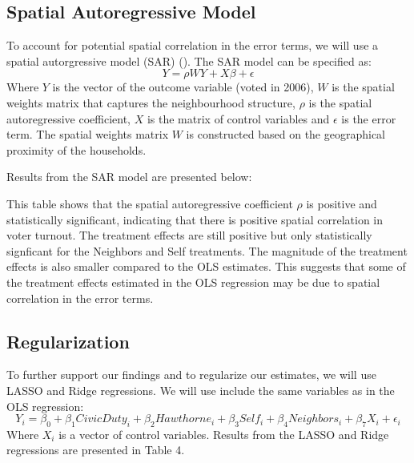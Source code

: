\documentclass[11pt]{article}
\begin{document}
\subsection{Spatial Autoregressive Model}
To account for potential spatial correlation in the error terms, we will use a spatial autorgressive model (SAR) (\cite{lord_chapter_2021}). The SAR model can be specified as:
\begin{equation}
    Y = \rho W Y + X\beta + \epsilon
\end{equation}
Where $Y$ is the vector of the outcome variable (voted in 2006), $W$ is the spatial weights matrix that captures the neighbourhood structure, $\rho$ is the spatial autoregressive coefficient, $X$ is the matrix of control variables and $\epsilon$ is the error term. The spatial weights matrix $W$ is constructed based on the geographical proximity of the households.

Results from the SAR model are presented below:

\begin{centering}
    
\end{centering}

This table shows that the spatial autoregressive coefficient $\rho$ is positive and statistically significant, indicating that there is positive spatial correlation in voter turnout. The treatment effects are still positive but only statistically signficant for the Neighbors and Self treatments. The magnitude of the treatment effects is also smaller compared to the OLS estimates. This suggests that some of the treatment effects estimated in the OLS regression may be due to spatial correlation in the error terms.

\subsection{Regularization}
To further support our findings and to regularize our estimates, we will use LASSO and Ridge regressions. We will use include the same variables as in the OLS regression:
\begin{equation}
    Y_i = \beta_0 + \beta_1 CivicDuty_i + \beta_2 Hawthorne_i + \beta_3 Self_i + \beta_4 Neighbors_i + \beta_7 X_i + \epsilon_i
\end{equation}
Where $X_i$ is a vector of control variables. Results from the LASSO and Ridge regressions are presented in Table 4.
\end{document}
